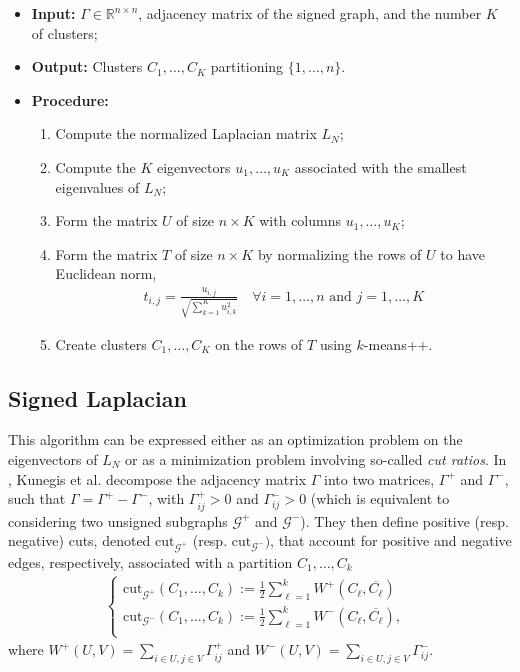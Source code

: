 \documentclass[sigconf]{acmart}
\begin{document}
\begin{itemize}
    \item \textbf{Input:} $\Gamma \in \mathbb{R}^{n \times n}$, adjacency matrix of the signed graph, and the number $K$ of clusters;
    \item \textbf{Output:} Clusters $C_1, \ldots, C_K$ partitioning $\{1, \ldots, n\}$.
    \item \textbf{Procedure: }
    \begin{enumerate}
        \item Compute the normalized Laplacian matrix $L_N$;
        \item Compute the $K$ eigenvectors $u_1, \ldots, u_K$ associated with the smallest eigenvalues of $L_N$;
        \item Form the matrix $U$ of size $n \times K$ with columns $u_1, \ldots, u_K$;
        \item Form the matrix $T$ of size $n \times K$ by normalizing the rows of $U$ to have Euclidean norm,
        \begin{align*}
            t_{i,j} = \frac{u_{i,j}}{\sqrt{\sum_{k=1}^K u_{i,k}^2}} \quad  \forall i = 1, \hdots, n \mbox{ and } j = 1, \ldots, K
        \end{align*}
        \item Create clusters $C_1, \ldots, C_K$ on the rows of $T$ using $k$-means++.
    \end{enumerate}
\end{itemize}


\subsection{Signed Laplacian}
This algorithm can be expressed either as an optimization problem on the eigenvectors of $L_N$ or as a minimization problem involving so-called \textit{cut ratios}. In \cite{KunegisSL}, Kunegis et al. decompose the adjacency matrix $\Gamma$ into two matrices, $\Gamma^+$ and $\Gamma^-$, such that $\Gamma = \Gamma^+ - \Gamma^-$, with $\Gamma^+_{ij} > 0$ and $\Gamma^-_{ij} > 0$ (which is equivalent to considering two unsigned subgraphs $\mathcal{G}^+$ and $\mathcal{G}^-$). They then define positive (resp. negative) cuts, denoted $\text{cut}_{\mathcal{G}^+}$ (resp. $\text{cut}_{\mathcal{G}^-})$, that account for positive and negative edges, respectively, associated with a partition $C_1, \ldots, C_k$
\begin{align*}
\begin{cases}
    \text{cut}_{\mathcal{G}^+}(C_1, \ldots, C_k) := \frac{1}{2} \sum_{\ell = 1}^k W^+(C_{\ell}, \overline{C_{\ell}}) \quad\\
    \text{cut}_{\mathcal{G}^-}(C_1, \ldots, C_k) := \frac{1}{2} \sum_{\ell = 1}^k W^-(C_{\ell}, \overline{C_{\ell}}), \\
\end{cases}
\end{align*}
where $W^+(U, V) = \sum_{i \in U, j \in V} \Gamma^+_{ij}$ and $W^-(U, V) = \sum_{i \in U, j \in V} \Gamma^-_{ij}$. 
\end{document}
